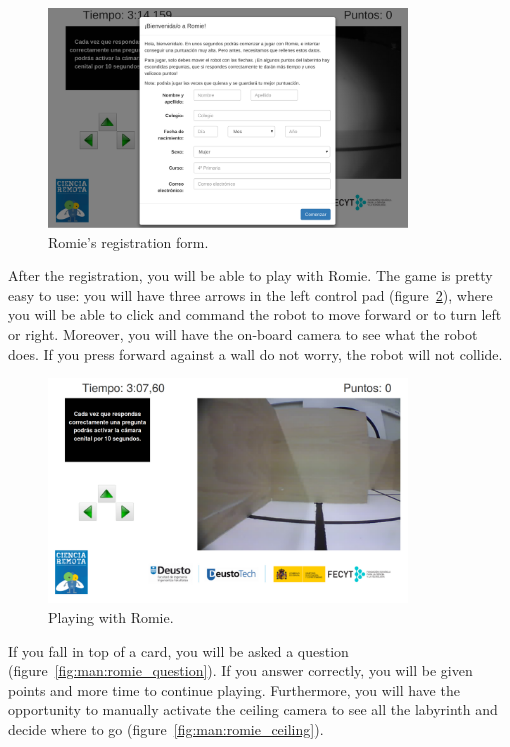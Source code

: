 \begin{figure}[!htbp]
	\centering
	\includegraphics[width=0.85\textwidth]{fig/manuals/trivial/romie-register}
	\caption{Romie's registration form.}
	\label{fig:man:romie_register}
\end{figure}

After the registration, you will be able to play with Romie. The game is pretty easy to use: you
will have three arrows in the left control pad (figure~\ref{fig:man:romie_start}), where you will be
able to click and command the robot to move forward or to turn left or right. Moreover, you will
have the on-board camera to see what the robot does. If you press forward against a wall do not
worry, the robot will not collide.

\begin{figure}[!htbp]
	\centering
	\includegraphics[width=0.85\textwidth]{fig/manuals/trivial/romie-start}
	\caption{Playing with Romie.}
	\label{fig:man:romie_start}
\end{figure}

If you fall in top of a card, you will be asked a question (figure~\ref{fig:man:romie_question}). If
you answer correctly, you will be given points and more time to continue playing. Furthermore, you
will have the opportunity to manually activate the ceiling camera to see all the labyrinth and
decide where to go (figure~\ref{fig:man:romie_ceiling}).

